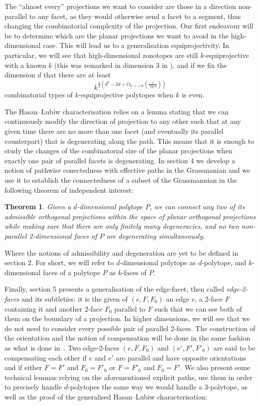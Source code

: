 \documentclass[12pt, notitlepage]{article}
\theoremstyle{plain}
\newtheorem{thm}{Theorem}[section]
\theoremstyle{definition}
\theoremstyle{plain}
\theoremstyle{remark}
\theoremstyle{plain}
\theoremstyle{plain}
\begin{document}
The “almost every” projections we want to consider are those in a direction non-parallel to any facet, as they would otherwise send a facet to a segment, thus changing the combinatorial complexity of the projection. Our first endeavour will be to determine which are the planar projections we want to avoid in the high-dimensional case. This will lead us to a generalisation  equiprojectivity. In particular, we will see that high-dimensional zonotopes are still $k$-equiprojective with a known $k$ (this was remarked in dimension 3 in \cite{TBLP}), and if we fix the dimension $d$ that there are at least \begin{equation}
    \label{borne}
    k^{\frac k2\left(d^2-2d + O_{k\to + \infty}\left( \frac{1}{\log k} \right) \right)}
\end{equation} combinatorial types of $k$-equiprojective polytopes when $k$ is even.

The Hasan--Lubiw characterisation relies on a lemma stating that we can continuously modify the direction of projection to any other such that at any given time there are no more than one facet (and eventually its parallel counterpart) that is degenerating along the path. This means that it is enough to study the changes of the combinatorial size of the planar projections when exactly one pair of parallel facets is degenerating. In section 4 we develop a notion of pathwise conectedness with effective paths in the Grassmanian and we use it to establish the connectedness of a subset of the Grassmannian in the following theorem of independent interest:

\begin{thm}
    \label{informal}
    Given a $d$-dimensional polytope $P$, we can connect any two of its admissible orthogonal projections within the space of planar orthogonal projections while making sure that there are only finitely many degeneracies, and no two non-parallel 2-dimensional faces of $P$ are degenerating simultaneously.
\end{thm}
\noindent Where the notions of admissibility and degeneration are yet to be defined in section 2. For short, we will refer to $d$-dimensional polytope as $d$-polytope, and $k$-dimensional faces of a polytope $P$ as $k$-faces of $P$.

Finally, section 5 presents a generalisation of the edge-facet, then called \emph{edge-2\nobreakdash-faces} and its subtleties: it is the given of $(e,F,F_0)$ an edge $e$, a 2-face $F$ containing it and another 2-face $F_0$ parallel to $F$ such that we can see both of them on the boundary of a projection. In higher dimensions, we will see that we do not need to consider every possible pair of parallel 2-faces. The construction of the orientation and the notion of compensation will be done in the same fashion as what is done in~\cite{MHAL}. Two edge-2-faces $(e,F,F_0)$ and $(e',F',F'_0)$ are said to be compensating each other if $e$ and $e'$ are parallel and have opposite orientations and if either $F=F'$ and $F_0=F'_0$ or $F=F'_0$ and $F_0= F'$. We also present some technical lemmas relying on the aforementioned explicit paths, use them in order to precisely handle $d$\nobreakdash-polytopes the same way we would handle a 3-polytope, as well as the proof of the generalised Hasan--Lubiw characterisation:
\end{document}
